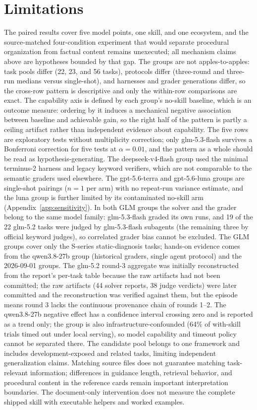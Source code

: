 \documentclass[11pt]{article}
\begin{document}
\section*{Limitations}

The paired results cover five model points, one skill, and one ecosystem, and the source-matched four-condition experiment that would separate procedural organization from factual content remains unexecuted; all mechanism claims above are hypotheses bounded by that gap.
The groups are not apples-to-apples: task pools differ (22, 23, and 56 tasks), protocols differ (three-round and three-run medians versus single-shot), and harnesses and grader generations differ, so the cross-row pattern is descriptive and only the within-row comparisons are exact.
The capability axis is defined by each group's no-skill baseline, which is an outcome measure: ordering by it induces a mechanical negative association between baseline and achievable gain, so the right half of the pattern is partly a ceiling artifact rather than independent evidence about capability.
The five rows are exploratory tests without multiplicity correction; only glm-5.3-flash survives a Bonferroni correction for five tests at $\alpha = 0.01$, and the pattern as a whole should be read as hypothesis-generating.
The deepseek-v4-flash group used the minimal terminus-2 harness and legacy keyword verifiers, which are not comparable to the semantic graders used elsewhere.
The gpt-5.6-terra and gpt-5.6-luna groups are single-shot pairings ($n = 1$ per arm) with no repeat-run variance estimate, and the luna group is further limited by its contaminated no-skill arm (Appendix~\ref{app:sensitivity}).
In both GLM groups the solver and the grader belong to the same model family: glm-5.3-flash graded its own runs, and 19 of the 22 glm-5.2 tasks were judged by glm-5.3-flash subagents (the remaining three by official keyword judges), so correlated grader bias cannot be excluded.
The GLM groups cover only the S-series static-diagnosis tasks; hands-on evidence comes from the qwen3.8-27b group (historical graders, single agent protocol) and the 2026-09-01 groups.
The glm-5.2 round-3 aggregate was initially reconstructed from the report's per-task table because the raw artifacts had not been committed; the raw artifacts (44 solver reports, 38 judge verdicts) were later committed and the reconstruction was verified against them, but the episode means round 3 lacks the continuous provenance chain of rounds 1--2.
The qwen3.8-27b negative effect has a confidence interval crossing zero and is reported as a trend only; the group is also infrastructure-confounded (64\% of with-skill trials timed out under local serving), so model capability and timeout policy cannot be separated there.
The candidate pool belongs to one framework and includes development-exposed and related tasks, limiting independent generalization claims.
Matching source files does not guarantee matching task-relevant information; differences in guidance length, retrieval behavior, and procedural content in the reference cards remain important interpretation boundaries.
The document-only intervention does not measure the complete shipped skill with executable helpers and worked examples.
\end{document}
